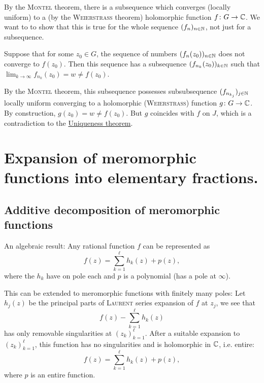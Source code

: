 \documentclass[a4paper,english]{article}
\begin{document}
\begin{pr}
    By the \textsc{Montel} theorem, there is a subsequence which converges (locally uniform) to a (by the \textsc{Weierstrass} theorem) holomorphic function $f \colon G \to \operatorname{\mathbb{C}}$.
    We want to to show that this is true for the whole sequence $(f_n)_{n \in \operatorname{\mathbb{N}}}$, not just for a subsequence.
    
    Suppose that for some $z_0 \in G$, the sequence of numbers $(f_n(z_0))_{n \in \operatorname{\mathbb{N}}}$ does not converge to $f(z_0)$.
    Then this sequence has a subsequence $(f_{n_k}(z_0))_{k \in \operatorname{\mathbb{N}}}$ such that $\lim_{k \to \infty} f_{n_k}(z_0) = w \ne f(z_0)$.
    
    By the \textsc{Montel} theorem, this subsequence possesses subsubsequence $(f_{n_{k_j}})_{j \in \operatorname{\mathbb{N}}}$ locally uniform converging to a holomorphic (\textsc{Weierstrass}) function $g \colon G \to \operatorname{\mathbb{C}}$.
    By construction, $g(z_0) = w \ne f(z_0)$.
    But $g$ coincides with $f$ on $J$, which is a contradiction to the \hyperref[th:unique]{Uniqueness theorem}.
\end{pr}


\section{Expansion of meromorphic functions into elementary fractions.}

\subsection{Additive decomposition of meromorphic functions}

An algebraic result: Any rational function $f$ can be represented as 
\begin{equation*}
    f(z)
    = \sum_{k = 1}^{\ell} h_k(z) + p(z),
\end{equation*}
where the  $h_k$ have on pole each and $p$ is a polynomial (has a pole at $\infty$).

This can be extended to meromorphic functions with finitely many poles: Let $h_j(z)$ be the principal parts of \textsc{Laurent} series expansion of $f$ at $z_j$, we see that
\begin{equation*}
   f(z) - \sum_{k = 1}^{\ell} h_k(z) 
\end{equation*}
has only removable singularities at $(z_k)_{k = 1}^{\ell}$.
After a suitable expansion to $(z_k)_{k = 1}^{\ell}$, this function has no singularities and is holomorphic in $\operatorname{\mathbb{C}}$, i.e. entire:
\begin{equation*}
    f(z)
    = \sum_{k = 1}^{\ell} h_k(z) + p(z),
\end{equation*}
where $p$ is an entire function.
\end{document}
